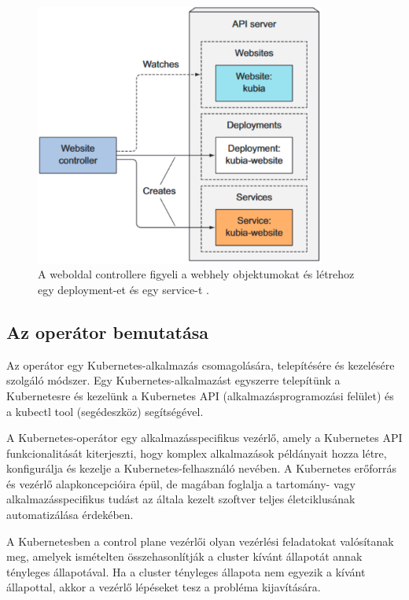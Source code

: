 \begin{figure}[ht]
    \centering
         \includegraphics[width=0.85\textwidth]{figures/kubernetes/custom-controller.png}
          \caption{A weboldal controllere figyeli a webhely objektumokat és létrehoz egy deployment-et és egy service-t \cite{Marko17}.}
           \label{custom-controller}
\end{figure}

\newpage

\subsection{Az operátor bemutatása}
Az operátor egy Kubernetes-alkalmazás csomagolására, telepítésére és kezelésére szolgáló módszer. Egy Kubernetes-alkalmazást egyszerre telepítünk a Kubernetesre és kezelünk a Kubernetes API (alkalmazásprogramozási felület) és a kubectl tool (segédeszköz) segítségével.

A Kubernetes-operátor egy alkalmazásspecifikus vezérlő, amely a Kubernetes API funkcionalitását kiterjeszti, hogy komplex alkalmazások példányait hozza létre, konfigurálja és kezelje a Kubernetes-felhasználó nevében.
A Kubernetes erőforrás és vezérlő alapkoncepcióira épül, de magában foglalja a tartomány- vagy alkalmazásspecifikus tudást az általa kezelt szoftver teljes életciklusának automatizálása érdekében. 

A Kubernetesben a control plane vezérlői olyan vezérlési feladatokat valósítanak meg, amelyek ismételten összehasonlítják a cluster kívánt állapotát annak tényleges állapotával.
Ha a cluster tényleges állapota nem egyezik a kívánt állapottal, akkor a vezérlő lépéseket tesz a probléma kijavítására. 


